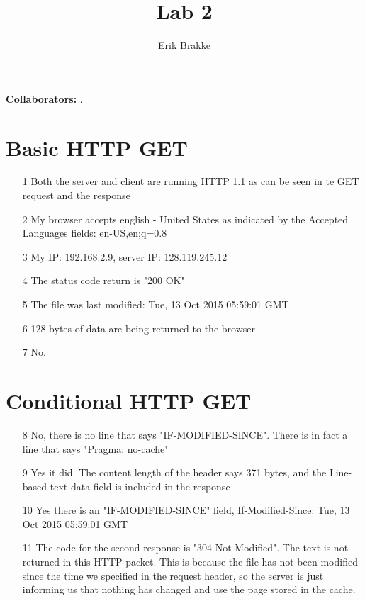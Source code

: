 \documentclass[11pt]{article}
\providecommand{\myparab}[1]{\smallskip\noindent\textbf{#1} }
\theoremstyle{definition}
\begin{document}
\title{Lab 2}
\author{Erik Brakke}
\maketitle

\thispagestyle{fancy}

\myparab{Collaborators: }  .
 
 
\section*{Basic HTTP GET}
\begin{enumerate}
	\item[1] Both the server and client are running HTTP 1.1 as can be seen in te GET request and the response

	\item[2] My browser accepts english - United States as indicated by the Accepted Languages fields: en-US,en;q=0.8

	\item[3] My IP: 192.168.2.9, server IP: 128.119.245.12\\

	\item[4] The status code return is "200 OK"\\

	\item[5] The file was last modified: Tue, 13 Oct 2015 05:59:01 GMT\\

	\item[6] 128 bytes of data are being returned to the browser\\

	\item[7] No.
\end{enumerate}

\section*{Conditional HTTP GET}
\begin{enumerate}
	\item[8] No, there is no line that says "IF-MODIFIED-SINCE".  There is in fact a line that says "Pragma: no-cache"\\

	\item[9] Yes it did.  The content length of the header says 371 bytes, and the Line-based text data field is included in the response\\

	\item[10] Yes there is an "IF-MODIFIED-SINCE" field, If-Modified-Since: Tue, 13 Oct 2015 05:59:01 GMT\\

	\item[11] The code for the second response is "304 Not Modified".  The text is not returned in this HTTP packet.  This is because the file has not been modified since the time we specified in the request header, so the server is just informing us that nothing has changed and use the page stored in the cache.  
\end{enumerate}
\end{document}
